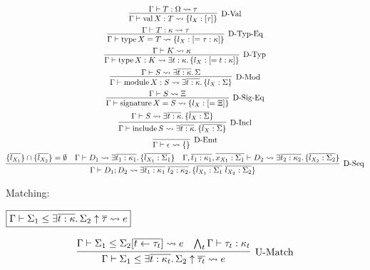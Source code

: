 \begin{gather*}
  \infer[\text{D-Val}]{\Gamma \vdash \symval X: T \elaborate \{l_X: [\tau]\}}{
    \Gamma \vdash T: \Omega \elaborate \tau
  }
  \\
  \infer[\text{D-Typ-Eq}]{\Gamma \vdash \symtype X = T \elaborate \{l_X: [= \tau: \kappa]\}}{
    \Gamma \vdash T: \kappa \elaborate \tau
  }
  \\
  \infer[\text{D-Typ}]{\Gamma \vdash \symtype X: K \elaborate \exists t: \kappa\ldotp \{l_X: [= t: \kappa]\}}{
    \Gamma \vdash K \elaborate \kappa
  }
  \\
  \infer[\text{D-Mod}]{\Gamma \vdash \symmodule X: S \elaborate \exists \overline{t: \kappa}\ldotp \{l_X: \Sigma\}}{
    \Gamma \vdash S \elaborate \exists \overline{t: \kappa}\ldotp \Sigma
  }
  \\
  \infer[\text{D-Sig-Eq}]{\Gamma \vdash \symsignature X = S \elaborate \{l_X: [= \Xi]\}}{
    \Gamma \vdash S \elaborate \Xi
  }
  \\
  \infer[\text{D-Incl}]{\Gamma \vdash \syminclude S \elaborate \exists \overline{t: \kappa}\ldotp \{\overline{l_X: \Sigma}\}}{
    \Gamma \vdash S \elaborate \exists \overline{t: \kappa}\ldotp \{\overline{l_X: \Sigma}\}
  }
  \\
  \infer[\text{D-Emt}]{\Gamma \vdash \epsilon \elaborate \{\}}{}
  \\
  \infer[\text{D-Seq}]{\Gamma \vdash D_1; D_2 \elaborate \exists \overline{t_1: \kappa_1}\; \overline{t_2: \kappa_2}\ldotp \{\overline{l_{X_1}: \Sigma_1}\; \overline{l_{X_2}: \Sigma_2}\}}{
    \{\overline{l_{X_1}}\} \cap \{\overline{l_{X_2}}\} = \emptyset
    &
    \Gamma \vdash D_1 \elaborate \exists \overline{t_1: \kappa_1}\ldotp \{\overline{l_{X_1}: \Sigma_1}\}
    &
    \Gamma, \overline{t_1: \kappa_1}, \overline{x_{X_1}: \Sigma_1} \vdash D_2 \elaborate \exists \overline{t_2: \kappa_2}\ldotp \{\overline{l_{X_2}: \Sigma_2}\}
  }
\end{gather*}

Matching:

$\fbox{$\Gamma \vdash \Sigma_1 \leq \exists \overline{t: \kappa}\ldotp \Sigma_2 \uparrow \overline{\tau} \rightsquigarrow e$}$

\begin{gather*}
  \infer[\text{U-Match}]{\Gamma \vdash \Sigma_1 \leq \exists \overline{t: \kappa_t}\ldotp \Sigma_2 \uparrow \overline{\tau_t} \elaborate e}{
    \Gamma \vdash \Sigma_1 \leq \Sigma_2[\overline{t \assign \tau_t}] \elaborate e
    &
    \bigwedge_t \Gamma \vdash \tau_t: \kappa_t
  }
\end{gather*}

